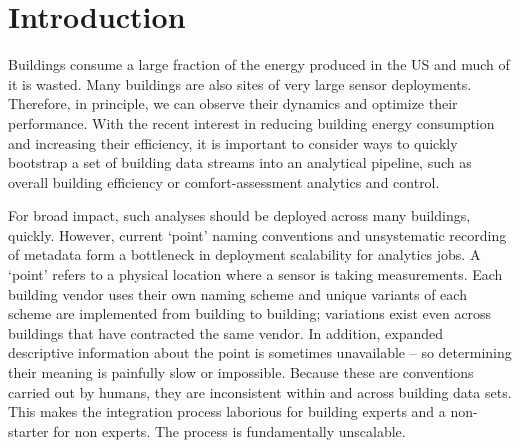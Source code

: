 \section{Introduction}




Buildings consume a large fraction of the energy produced in the US and much of it is wasted.
Many buildings are also sites of very large sensor deployments.  Therefore, in principle, we can observe
their dynamics and optimize their performance.
With the recent interest in reducing building energy consumption and
increasing their efficiency, it
is important to consider ways to quickly bootstrap a set of building data streams
into an analytical pipeline, such as overall building efficiency or
comfort-assessment analytics and control.

For broad impact, such analyses should be deployed across many buildings, quickly. 
However, current `point' naming conventions and unsystematic recording of metadata form a 
bottleneck in deployment scalability for analytics jobs.  A `point' refers to a 
physical location where a sensor is taking measurements. 
Each building vendor uses their own naming scheme and
unique variants of each scheme are implemented from building to building; variations exist
even across buildings that have contracted the same vendor.
In addition, expanded descriptive information about the point is sometimes unavailable 
-- so determining their meaning is painfully slow or impossible.  
Because these are conventions carried
out by humans, they are inconsistent within and across building data sets.
This makes the integration process laborious for building experts and a non-starter for 
non experts.  The process is fundamentally unscalable. 

